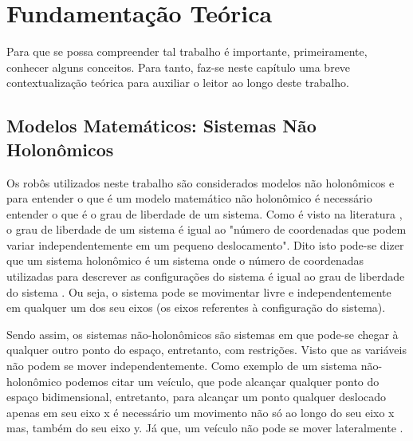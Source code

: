 %
%

\chapter{Fundamentação Teórica}
\label{chap:fundamentacaoTeorica}
Para que se possa %
compreender tal trabalho é importante, primeiramente, conhecer alguns conceitos. Para tanto, faz-se neste capítulo uma breve contextualização teórica para auxiliar o leitor ao longo deste trabalho. 

\section{Modelos Matemáticos: Sistemas Não Holonômicos}
\label{sec:modeloMatematicoNHolonomico}
Os robôs utilizados neste trabalho são considerados modelos não holonômicos e para entender o que é um modelo matemático não holonômico é necessário entender o que é o grau de liberdade de um sistema. Como é visto na literatura \cite{TJRD13}, o grau de liberdade de um sistema é igual ao "número de coordenadas que podem variar independentemente em um pequeno deslocamento". Dito isto pode-se dizer que um sistema holonômico é um sistema onde o número de coordenadas utilizadas para descrever as configurações do sistema é igual ao grau de liberdade do sistema \cite{TJRD13}. Ou seja, o sistema pode se movimentar livre e independentemente em qualquer um dos seu eixos (os eixos referentes à configuração do sistema).

Sendo assim, os sistemas não-holonômicos são sistemas em que pode-se chegar à qualquer outro ponto do espaço, entretanto, com restrições. Visto que as variáveis não podem se mover independentemente. Como exemplo de um sistema não-holonômico podemos citar um veículo, que pode alcançar qualquer ponto do espaço bidimensional, entretanto, para alcançar um ponto qualquer deslocado apenas em seu eixo x é necessário um movimento não só ao longo do seu eixo x mas, também do seu eixo y. Já que, um veículo não pode se mover lateralmente \cite{GJA11}.

